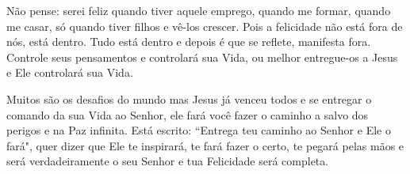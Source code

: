\emdash{}Não pense: serei feliz quando tiver aquele emprego, quando me formar, quando me casar, só quando tiver filhos e vê-los crescer. Pois a felicidade não está fora de nós, está dentro. Tudo está dentro e depois é que se reflete, manifesta fora. Controle seus pensamentos e controlará sua Vida, ou melhor entregue-os a Jesus e Ele controlará sua Vida.

\emdash{}Muitos são os desafios do mundo mas Jesus já venceu todos e se entregar o comando da sua Vida ao Senhor, ele fará você fazer o caminho a salvo dos perigos e na Paz infinita. Está escrito: ``Entrega teu caminho ao Senhor e Ele o fará", quer dizer que Ele te inspirará, te fará fazer o certo, te pegará pelas mãos e será verdadeiramente o seu Senhor e tua Felicidade será completa.